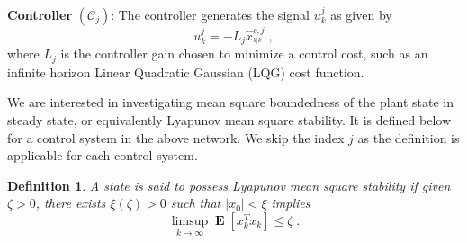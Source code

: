 \documentclass[twocolumn]{autart}
\DeclareMathOperator*{\E}{{\mathbf E}}        \let\Pr\undefined \DeclareMathOperator{\Pr}{{\mathbf P}}        \DeclareMathOperator*{\argmax}{arg\,max}
\newtheorem{definition}{Definition}[section]
\begin{document}
\noindent \textbf{Controller} $(\mathcal{C}_j)$: The controller generates the signal $u^{j}_k$ as given by
\begin{equation}
\label{Eq:Controller}
u^{j}_k = - L_j \hat{x}^{c,j}_{^{k|k}} \; ,
\end{equation}
where $L_j$ is the controller gain chosen to minimize a control cost, such as an infinite horizon Linear Quadratic Gaussian (LQG) cost function. 

We are interested in investigating mean square boundedness of the plant state in steady state, or equivalently Lyapunov mean square stability. It is defined below for a control system in the above network. We skip the index $j$ as the definition is applicable for each control system.
\begin{definition} \textbf{} \label{Def:MSS}
A state is said to possess Lyapunov mean square stability if given $\zeta > 0$, there exists $\xi(\zeta) > 0$ such that $|x_0| < \xi$ implies
\begin{equation} \label{Eq:LMSS}
\limsup_{k \rightarrow \infty} \E[x_k^T x_k] \le \zeta \; .
\end{equation}
\end{definition}
\end{document}
